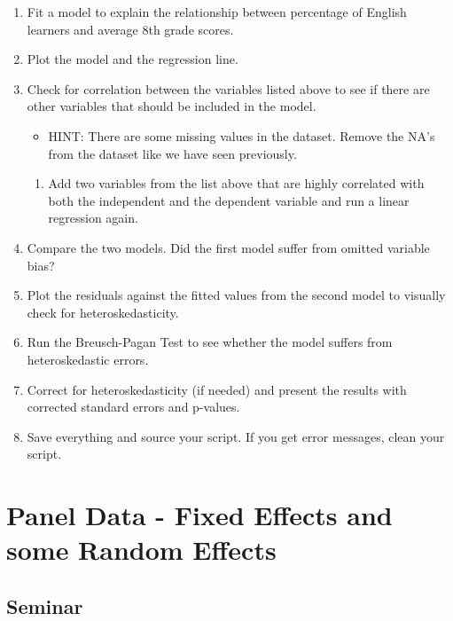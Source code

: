 \documentclass[]{article}
\providecommand{\tightlist}{%
  \setlength{\itemsep}{0pt}\setlength{\parskip}{0pt}}
\theoremstyle{definition}
\theoremstyle{definition}
\theoremstyle{definition}
\theoremstyle{remark}
\begin{document}
\begin{enumerate}
\def\labelenumi{\arabic{enumi}.}
\setcounter{enumi}{13}
\tightlist
\item
  Fit a model to explain the relationship between percentage of English
  learners and average 8th grade scores.
\item
  Plot the model and the regression line.
\item
  Check for correlation between the variables listed above to see if
  there are other variables that should be included in the model.

  \begin{itemize}
  \tightlist
  \item
    HINT: There are some missing values in the dataset. Remove the NA's
    from the dataset like we have seen previously.
  \end{itemize}

  \begin{enumerate}
  \def\labelenumii{\alph{enumii}.}
  \tightlist
  \item
    Add two variables from the list above that are highly correlated
    with both the independent and the dependent variable and run a
    linear regression again.
  \end{enumerate}
\item
  Compare the two models. Did the first model suffer from omitted
  variable bias?
\item
  Plot the residuals against the fitted values from the second model to
  visually check for heteroskedasticity.
\item
  Run the Breusch-Pagan Test to see whether the model suffers from
  heteroskedastic errors.
\item
  Correct for heteroskedasticity (if needed) and present the results
  with corrected standard errors and p-values.
\item
  Save everything and source your script. If you get error messages,
  clean your script.
\end{enumerate}

\section{Panel Data - Fixed Effects and some Random
Effects}\label{panel-data---fixed-effects-and-some-random-effects}

\subsection{Seminar}\label{seminar-9}
\end{document}
